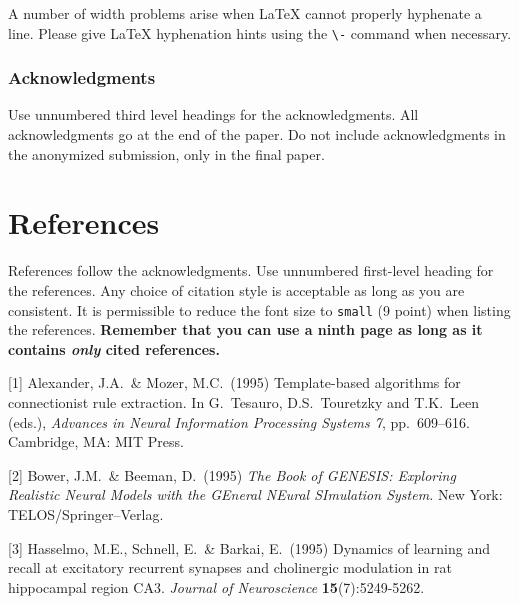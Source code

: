 \documentclass{article}
\begin{document}
  A number of width problems arise when \LaTeX{} cannot properly
  hyphenate a line. Please give LaTeX hyphenation hints using the
  \verb+\-+ command when necessary.
  
  \subsubsection*{Acknowledgments}
  
  Use unnumbered third level headings for the acknowledgments. All
  acknowledgments go at the end of the paper. Do not include
  acknowledgments in the anonymized submission, only in the final paper.
  
  \section*{References}
  
  References follow the acknowledgments. Use unnumbered first-level
  heading for the references. Any choice of citation style is acceptable
  as long as you are consistent. It is permissible to reduce the font
  size to \verb+small+ (9 point) when listing the references. {\bf
    Remember that you can use a ninth page as long as it contains
    \emph{only} cited references.}
  \medskip
  
  \small
  
  [1] Alexander, J.A.\ \& Mozer, M.C.\ (1995) Template-based algorithms
  for connectionist rule extraction. In G.\ Tesauro, D.S.\ Touretzky and
  T.K.\ Leen (eds.), {\it Advances in Neural Information Processing
    Systems 7}, pp.\ 609--616. Cambridge, MA: MIT Press.
  
  [2] Bower, J.M.\ \& Beeman, D.\ (1995) {\it The Book of GENESIS:
    Exploring Realistic Neural Models with the GEneral NEural SImulation
    System.}  New York: TELOS/Springer--Verlag.
  
  [3] Hasselmo, M.E., Schnell, E.\ \& Barkai, E.\ (1995) Dynamics of
  learning and recall at excitatory recurrent synapses and cholinergic
  modulation in rat hippocampal region CA3. {\it Journal of
    Neuroscience} {\bf 15}(7):5249-5262.
  
  
\end{document}
